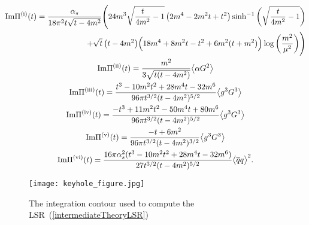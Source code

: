 \documentclass[11pt, letterpaper]{article}
\newcommand{\glueFourD}{\big\langle \alpha G^{2} \big\rangle}
\newcommand{\glueSixD}{\big\langle g^{3} G^{3} \big\rangle}
\newcommand{\rom}[1]{\uppercase\expandafter{\romannumeral #1\relax}}
\begin{document}
\begin{gather} \label{ImP}
\begin{split}
\mathrm{Im}\Pi^{\text{(\rom{1})}}(t) = 
\frac{\alpha_s}{18\pi^2 t\sqrt{t-4m^2}}
\Bigg(
  24m^3\sqrt{\frac{t}{4m^2}-1}\,\big(2m^4-2m^2 t+t^2\big)
  \sinh^{-1}\bigg(\sqrt{\frac{t}{4m^2}-1}\bigg)
  \\
  +\sqrt{t}\,\big(t-4m^2\big)\Big(18m^4+8m^2 t-t^2+6m^2(t+m^2)\Big)\log\bigg(\frac{m^2}{\mu^2}\bigg)
\Bigg)
\end{split}
\\
%
\label{Imfourd}
  \mathrm{Im}\Pi^{\text{(\rom{2})}}(t)
  = \frac{m^2}{3\sqrt{t(t-4m^2)}}\glueFourD
\\
%
\label{Imsixd}
  \mathrm{Im}\Pi^{\text{(\rom{3})}}(t)=
  \frac{t^3 - 10m^2 t^2 + 28m^4 t - 32m^6}{96 \pi t^{3/2} (t-4m^2)^{5/2}}
  \glueSixD
  \\
%
\label{ImDiag4}
  \mathrm{Im}\Pi^{\text{(\rom{4})}}(t)=
  \frac{-t^3 + 11m^2 t^2 - 50m^4 t + 80m^6}{96 \pi t^{3/2} (t-4m^2)^{5/2}}
  \glueSixD
  \\
%
\label{ImDiag5}
  \mathrm{Im}\Pi^{\text{(\rom{5})}}(t)=
  \frac{-t + 6m^2}{96 \pi t^{3/2} (t-4m^2)^{3/2}}
  \glueSixD
  \\
%
\label{ImDiag6}
  \mathrm{Im}\Pi^{\text{(\rom{6})}}(t)=
  \frac{16 \pi \alpha_s^2 (t^3 - 10m^2 t^2 + 28m^4 t - 32m^6)}{27 t^{3/2} (t-4m^2)^{5/2}}
  \big\langle \overline{q}q \big\rangle^2.
\end{gather}

\begin{figure}
\centering
\texttt{[image: keyhole\_figure.jpg]}
\caption{\label{keyhole} The integration contour used to compute the 
  LSR~(\ref{intermediateTheoryLSR})}
\end{figure}
\end{document}
